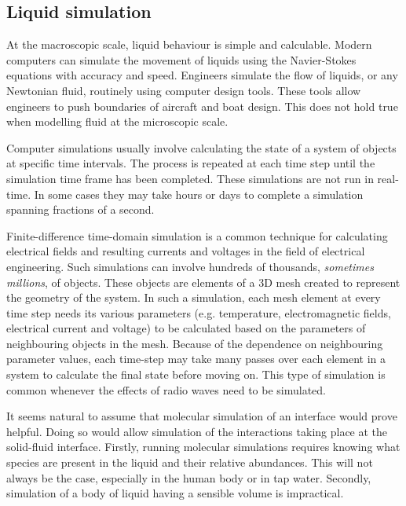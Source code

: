   \subsection{Liquid simulation}
    \label{sub:molecularSimulation}

    At the macroscopic scale, liquid behaviour is simple and calculable.
    Modern computers can simulate the movement of liquids using the Navier-Stokes equations with accuracy and speed.
    Engineers simulate the flow of liquids, or any Newtonian fluid, routinely using computer design tools.
    These tools allow engineers to push boundaries of aircraft and boat design.
    This does not hold true when modelling fluid at the microscopic scale.

    Computer simulations usually involve calculating the state of a system of objects at specific time intervals.
    The process is repeated at each time step until the simulation time frame has been completed.
    These simulations are not run in real-time.
    In some cases they may take hours or days to complete a simulation spanning fractions of a second.

    Finite-difference time-domain simulation is a common technique for calculating electrical fields and resulting currents and voltages in the field of electrical engineering.
    Such simulations can involve hundreds of thousands, \emph{sometimes millions}, of objects.
    These objects are elements of a 3D mesh created to represent the geometry of the system.
    In such a simulation, each mesh element at every time step needs its various parameters (e.g. temperature, electromagnetic fields, electrical current and voltage) to be calculated based on the parameters of neighbouring objects in the mesh.
    Because of the dependence on neighbouring parameter values, each time-step may take many passes over each element in a system to calculate the final state before moving on.
    This type of simulation is common whenever the effects of radio waves need to be simulated.

    It seems natural to assume that molecular simulation of an interface would prove helpful.
    Doing so would allow simulation of the interactions taking place at the solid-fluid interface.
    Firstly, running molecular simulations requires knowing what species are present in the liquid and their relative abundances.
    This will not always be the case, especially in the human body or in tap water.
    Secondly, simulation of a body of liquid having a sensible volume is impractical.

